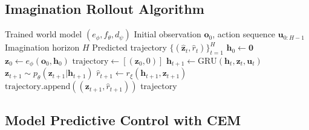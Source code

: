\subsection{Imagination Rollout Algorithm}

\begin{algorithm}[H]
\caption{Imagination Rollout for Planning}
\begin{algorithmic}[1]
\Require Trained world model $(e_\phi, f_\theta, d_\psi)$
\Require Initial observation $\mathbf{o}_0$, action sequence $\mathbf{u}_{0:H-1}$
\Require Imagination horizon $H$
\Ensure Predicted trajectory $\{(\hat{\mathbf{z}}_t, \hat{r}_t)\}_{t=1}^H$
\State $\mathbf{h}_0 \gets \mathbf{0}$ 
\State $\mathbf{z}_0 \gets e_\phi(\mathbf{o}_0, \mathbf{h}_0)$ 
\State $\text{trajectory} \gets [(\mathbf{z}_0, 0)]$
    \State $\mathbf{h}_{t+1} \gets \text{GRU}(\mathbf{h}_t, \mathbf{z}_t, \mathbf{u}_t)$ 
    \State $\mathbf{z}_{t+1} \sim p_\theta(\mathbf{z}_{t+1} | \mathbf{h}_{t+1})$ 
    \State $\hat{r}_{t+1} \gets r_\xi(\mathbf{h}_{t+1}, \mathbf{z}_{t+1})$ 
    \State $\text{trajectory}.\text{append}((\mathbf{z}_{t+1}, \hat{r}_{t+1}))$
\EndFor
\State \Return trajectory
\end{algorithmic}
\end{algorithm}

\subsection{Model Predictive Control with CEM}

